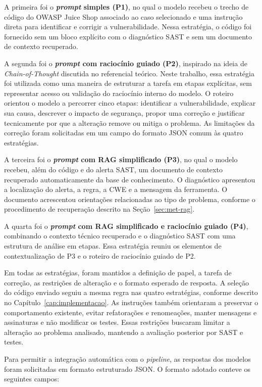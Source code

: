 A primeira foi o \textbf{\textit{prompt} simples (P1)}, no qual o modelo recebeu o trecho de código do OWASP Juice Shop associado ao caso selecionado e uma instrução direta para identificar e corrigir a vulnerabilidade. Nessa estratégia, o código foi fornecido sem um bloco explícito com o diagnóstico SAST e sem um documento de contexto recuperado.

A segunda foi o \textbf{\textit{prompt} com raciocínio guiado (P2)}, inspirado na ideia de \textit{Chain-of-Thought} discutida no referencial teórico. Neste trabalho, essa estratégia foi utilizada como uma maneira de estruturar a tarefa em etapas explícitas, sem representar acesso ou validação do raciocínio interno do modelo. O roteiro orientou o modelo a percorrer cinco etapas: identificar a vulnerabilidade, explicar sua causa, descrever o impacto de segurança, propor uma correção e justificar tecnicamente por que a alteração remove ou mitiga o problema. As limitações da correção foram solicitadas em um campo do formato JSON comum às quatro estratégias.

A terceira foi o \textbf{\textit{prompt} com RAG simplificado (P3)}, no qual o modelo recebeu, além do código e do alerta SAST, um documento de contexto recuperado automaticamente da base de conhecimento. O diagnóstico apresentou a localização do alerta, a regra, a CWE e a mensagem da ferramenta. O documento acrescentou orientações relacionadas ao tipo de problema, conforme o procedimento de recuperação descrito na Seção~\ref{sec:met-rag}.

A quarta foi o \textbf{\textit{prompt} com RAG simplificado e raciocínio guiado (P4)}, combinando o contexto técnico recuperado e o diagnóstico SAST com uma estrutura de análise em etapas. Essa estratégia reuniu os elementos de contextualização de P3 e o roteiro de raciocínio guiado de P2.

Em todas as estratégias, foram mantidos a definição de papel, a tarefa de correção, as restrições de alteração e o formato esperado de resposta. A seleção do código enviado seguiu a mesma regra nas quatro estratégias, conforme descrito no Capítulo~\ref{cap:implementacao}. As instruções também orientaram a preservar o comportamento existente, evitar refatorações e renomeações, manter mensagens e assinaturas e não modificar os testes. Essas restrições buscaram limitar a alteração ao problema analisado, mantendo a avaliação posterior por SAST e testes.

Para permitir a integração automática com o \textit{pipeline}, as respostas dos modelos foram solicitadas em formato estruturado JSON. O formato adotado conteve os seguintes campos:

